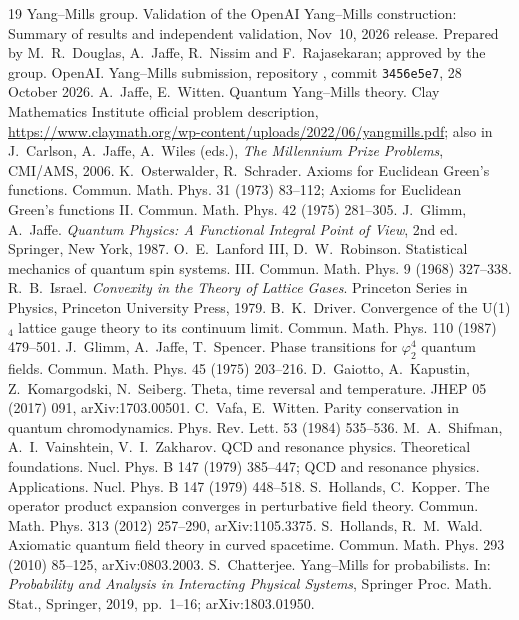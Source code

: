 \documentclass[11pt,a4paper]{article}
\theoremstyle{plain}
\begin{document}
\begin{thebibliography}{19}\small
{} Yang--Mills group. Validation of the OpenAI Yang--Mills construction: Summary of results and independent validation, Nov~10, 2026 release. Prepared by M.~R.~Douglas, A.~Jaffe, R.~Nissim and F.~Rajasekaran; approved by the group.
 OpenAI. Yang--Mills submission, repository , commit \texttt{3456e5e7}, 28 October 2026.
 A.~Jaffe, E.~Witten. Quantum Yang--Mills theory. Clay Mathematics Institute official problem description, \url{https://www.claymath.org/wp-content/uploads/2022/06/yangmills.pdf}; also in J.~Carlson, A.~Jaffe, A.~Wiles (eds.), \emph{The Millennium Prize Problems}, CMI/AMS, 2006.
 K.~Osterwalder, R.~Schrader. Axioms for Euclidean Green's functions. Commun. Math. Phys. 31 (1973) 83--112; Axioms for Euclidean Green's functions II. Commun. Math. Phys. 42 (1975) 281--305.
 J.~Glimm, A.~Jaffe. \emph{Quantum Physics: A Functional Integral Point of View}, 2nd ed. Springer, New York, 1987.
 O.~E.~Lanford III, D.~W.~Robinson. Statistical mechanics of quantum spin systems. III. Commun. Math. Phys. 9 (1968) 327--338.
 R.~B.~Israel. \emph{Convexity in the Theory of Lattice Gases}. Princeton Series in Physics, Princeton University Press, 1979.
 B.~K.~Driver. Convergence of the U(1)$_4$ lattice gauge theory to its continuum limit. Commun. Math. Phys. 110 (1987) 479--501.
 J.~Glimm, A.~Jaffe, T.~Spencer. Phase transitions for $\varphi^4_2$ quantum fields. Commun. Math. Phys. 45 (1975) 203--216.
 D.~Gaiotto, A.~Kapustin, Z.~Komargodski, N.~Seiberg. Theta, time reversal and temperature. JHEP 05 (2017) 091, arXiv:1703.00501.
 C.~Vafa, E.~Witten. Parity conservation in quantum chromodynamics. Phys. Rev. Lett. 53 (1984) 535--536.
 M.~A.~Shifman, A.~I.~Vainshtein, V.~I.~Zakharov. QCD and resonance physics. Theoretical foundations. Nucl. Phys. B 147 (1979) 385--447; QCD and resonance physics. Applications. Nucl. Phys. B 147 (1979) 448--518.
 S.~Hollands, C.~Kopper. The operator product expansion converges in perturbative field theory. Commun. Math. Phys. 313 (2012) 257--290, arXiv:1105.3375.
 S.~Hollands, R.~M.~Wald. Axiomatic quantum field theory in curved spacetime. Commun. Math. Phys. 293 (2010) 85--125, arXiv:0803.2003.
 S.~Chatterjee. Yang--Mills for probabilists. In: \emph{Probability and Analysis in Interacting Physical Systems}, Springer Proc. Math. Stat., Springer, 2019, pp.~1--16; arXiv:1803.01950.

\end{thebibliography}
\end{document}
